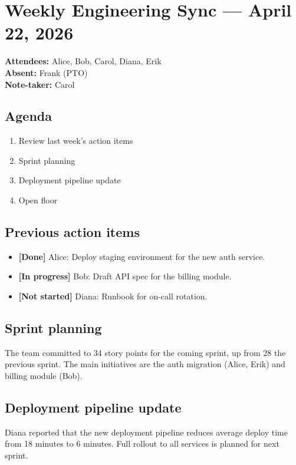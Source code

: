 \documentclass{article}
\begin{document}
\section*{Weekly Engineering Sync --- April 22, 2026}

\textbf{Attendees:} Alice, Bob, Carol, Diana, Erik \\
\textbf{Absent:} Frank (PTO) \\
\textbf{Note-taker:} Carol

\subsection*{Agenda}
\begin{enumerate}[noitemsep]
  \item Review last week's action items
  \item Sprint planning
  \item Deployment pipeline update
  \item Open floor
\end{enumerate}

\subsection*{Previous action items}
\begin{itemize}[noitemsep]
  \item \textbf{[Done]} Alice: Deploy staging environment for the new auth service.
  \item \textbf{[In progress]} Bob: Draft API spec for the billing module.
  \item \textbf{[Not started]} Diana: Runbook for on-call rotation.
\end{itemize}

\subsection*{Sprint planning}
The team committed to 34 story points for the coming sprint, up from 28 the previous sprint. The main initiatives are the auth migration (Alice, Erik) and billing module (Bob).

\subsection*{Deployment pipeline update}
Diana reported that the new deployment pipeline reduces average deploy time from 18 minutes to 6 minutes. Full rollout to all services is planned for next sprint.
\end{document}
